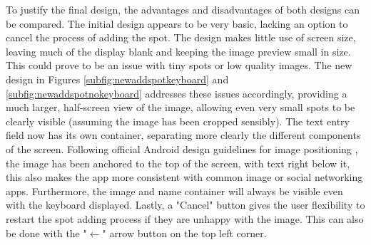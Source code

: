 To justify the final design, the advantages and disadvantages of both designs can be compared. The initial design appears to be very basic, lacking an option to cancel the process of adding the spot. The design makes little use of screen size, leaving much of the display blank and keeping the image preview small in size. This could prove to be an issue with tiny spots or low quality images. The new design in Figures \ref{subfig:newaddspotkeyboard} and \ref{subfig:newaddspotnokeyboard} addresses these issues accordingly, providing a much larger, half-screen view of the image, allowing even very small spots to be clearly visible (assuming the image has been cropped sensibly). The text entry field now has its own container, separating more clearly the different components of the screen. Following official Android design guidelines for image positioning \cite{materialdesignimageplacement}, the image has been anchored to the top of the screen, with text right below it, this also makes the app more consistent with common image or social networking apps. Furthermore, the image and name container will always be visible even with the keyboard displayed. Lastly, a "Cancel" button gives the user flexibility to restart the spot adding process if they are unhappy with the image. This can also be done with the "$\leftarrow$" arrow button on the top left corner.
\clearpage
